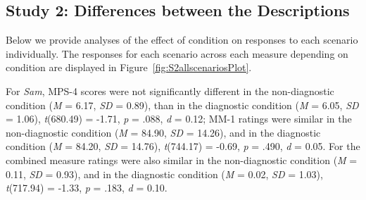 \documentclass[
  man,floatsintext]{apa6}
\begin{document}
\newpage

\subsection{Study 2: Differences between the Descriptions}\label{study-2-differences-between-the-descriptions}

Below we provide analyses of the effect of condition on responses to each scenario individually. The responses for each scenario across each measure depending on condition are displayed in Figure~\ref{fig:S2allscenariosPlot}.

For \emph{Sam}, MPS-4 scores were not significantly different in the non-diagnostic condition (\emph{M} = 6.17, \emph{SD} = 0.89), than in the diagnostic condition (\emph{M} = 6.05, \emph{SD} = 1.06), \emph{t}(680.49) = -1.71, \emph{p} = .088, \emph{d} = 0.12; MM-1 ratings were similar in the non-diagnostic condition (\emph{M} = 84.90, \emph{SD} = 14.26), and in the diagnostic condition (\emph{M} = 84.20, \emph{SD} = 14.76), \emph{t}(744.17) = -0.69, \emph{p} = .490, \emph{d} = 0.05. For the combined measure ratings were also similar in the non-diagnostic condition (\emph{M} = 0.11, \emph{SD} = 0.93), and in the diagnostic condition (\emph{M} = 0.02, \emph{SD} = 1.03), \emph{t}(717.94) = -1.33, \emph{p} = .183, \emph{d} = 0.10.

\newpage
\end{document}
